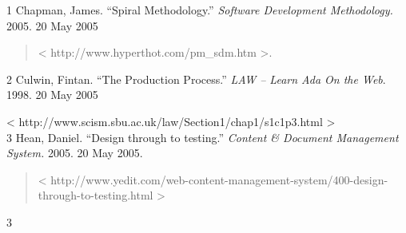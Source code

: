 \documentclass[
]{article}
\begin{document}
1 Chapman, James. ``Spiral Methodology.'' \emph{Software Development
Methodology.} 2005. 20 May 2005

\begin{quote}
\textless{} http://www.hyperthot.com/pm\_sdm.htm \textgreater.
\end{quote}

2 Culwin, Fintan. ``The Production Process.'' \emph{LAW -- Learn Ada On
the Web}. 1998. 20 May 2005

\textless{} http://www.scism.sbu.ac.uk/law/Section1/chap1/s1c1p3.html
\textgreater{}\\
3 Hean, Daniel. ``Design through to testing.'' \emph{Content \& Document
Management System.} 2005. 20 May 2005.

\begin{quote}
\textless{}
http://www.yedit.com/web-content-management-system/400-design-through-to-testing.html
\textgreater{}
\end{quote}

3
\end{document}
